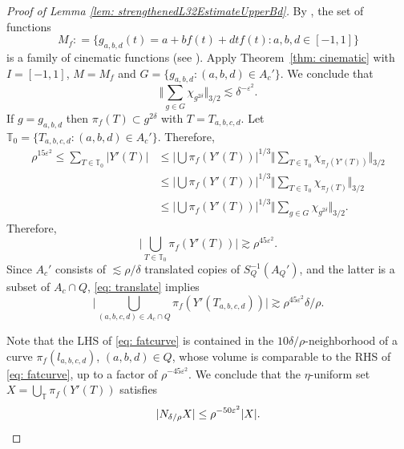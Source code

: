 \documentclass[letterpaper, reqno,11pt]{article}
\numberwithin{equation}{section}
\newcommand{\cP}{A}
\newcommand{\eps}{\varepsilon}
\numberwithin{thm}{section}
\theoremstyle{remark}
\begin{document}
\begin{proof}[Proof of Lemma \ref{lem: strengthenedL32EstimateUpperBd}]
By \cite[Lemma 7.3]{WZ}, the set of functions
\[ 
M_f: =\big\{ g_{a,b,d}(t)=a+bf(t)+ dtf(t): a,b,d\in [-1,1]\big\} 
\]
is a family of cinematic functions (see \cite[Definition 7.1]{WZ}). 
Apply  Theorem~\ref{thm: cinematic} with $I=[-1,1]$, $M=M_f$ and $G= \{g_{a,b,d}: (a,b,d)\in \cP_c'\}$. We conclude that
\[
\Big\Vert \sum_{g\in G} \chi_{g^{2\delta}} \Big\Vert_{3/2} \lesssim \delta^{-\eps^2}.
\]
If $g=g_{a,b,d}$ then $\pi_f(T)\subset g^{2\delta}$ with $T=T_{a,b,c,d}$. Let $\mathbb{T}_0=\{T_{a,b,c,d}: (a,b,d)\in \cP_c'\}$.
Therefore, 
\begin{align*}
    \rho^{15\eps^2} \leq \sum_{T\in \mathbb{T}_0} |Y'(T)|& \leq \Big|\bigcup \pi_f(Y'(T))\Big|^{1/3} \Big\Vert\sum_{T\in \mathbb{T}_0} \chi_{\pi_f(Y'(T))}\Big\Vert_{3/2} \\
    & \leq \Big|\bigcup \pi_f(Y'(T))\Big|^{1/3} \Big\Vert\sum_{T\in \mathbb{T}_0} \chi_{\pi_f(T)}\Big\Vert_{3/2} \\
    & \leq \Big|\bigcup \pi_f(Y'(T))\Big|^{1/3} \Big\Vert\sum_{g\in G} \chi_{g^{2\delta}} \Big\Vert_{3/2}.
\end{align*}
Therefore, 
\[
\Big|\bigcup_{T\in \mathbb{T}_0} \pi_f(Y'(T))\Big|\gtrsim  \rho^{45\eps^2}.
\]
 Since $\cP_c'$ consists of $\lesssim \rho/\delta$ translated copies of $ S_Q^{-1}(\cP_Q')$, and the latter is a subset of $\cP_c\cap Q$, \eqref{eq: translate} implies 
\begin{equation}\label{eq: fatcurve}
\Big|\bigcup_{(a,b,c,d)\in \cP_c\cap Q} \pi_f(Y'(T_{a,b,c,d}))\Big|\gtrsim \rho^{45\eps^2} \delta/\rho. 
\end{equation}

Note that the LHS of \eqref{eq: fatcurve} is contained in the $10\delta/\rho$-neighborhood of a curve $\pi_f(l_{a,b,c,d})$,  $(a,b,d)\in Q$, whose volume is comparable to the RHS of \eqref{eq: fatcurve}, up to a factor of $\rho^{-45\eps^2}$.  We conclude that the $\eta$-uniform set $X=\bigcup_{\mathbb{T}}\pi_f(Y'(T))$ satisfies 
\[
|N_{\delta/\rho}X|\leq \rho^{-50\eps^2} |X|.\qedhere
\]
\end{proof}
\end{document}
